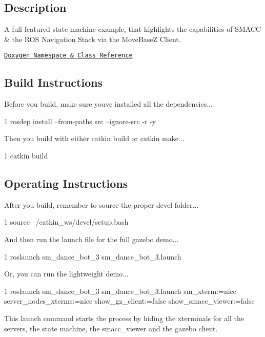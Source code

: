 

\subsection*{Description}

A full-\/featured state machine example, that highlights the capabilities of S\+M\+A\+CC \& the R\+OS Navigation Stack via the Move\+BaseZ Client.~\newline


\href{https://reelrbtx.github.io/SMACC_Documentation/master/html/namespacesm__dance__bot.html}{\tt Doxygen Namespace \& Class Reference}

\subsection*{Build Instructions}

Before you build, make sure you\textquotesingle{}ve installed all the dependencies...


\begin{DoxyCode}
1 rosdep install --from-paths src --ignore-src -r -y 
\end{DoxyCode}


Then you build with either catkin build or catkin make...


\begin{DoxyCode}
1 catkin build
\end{DoxyCode}
 \subsection*{Operating Instructions}

After you build, remember to source the proper devel folder...


\begin{DoxyCode}
1 source ~/catkin\_ws/devel/setup.bash
\end{DoxyCode}


And then run the launch file for the full gazebo demo...


\begin{DoxyCode}
1 roslaunch sm\_dance\_bot\_3 sm\_dance\_bot\_3.launch
\end{DoxyCode}


Or, you can run the lightweight demo...


\begin{DoxyCode}
1 roslaunch sm\_dance\_bot\_3 sm\_dance\_bot\_3.launch sm\_xterm:=nice server\_nodes\_xterms:=nice
       show\_gz\_client:=false show\_smacc\_viewer:=false
\end{DoxyCode}


This launch command starts the process by hiding the xterminals for all the servers, the state machine, the smacc\+\_\+viewer and the gazebo client. 